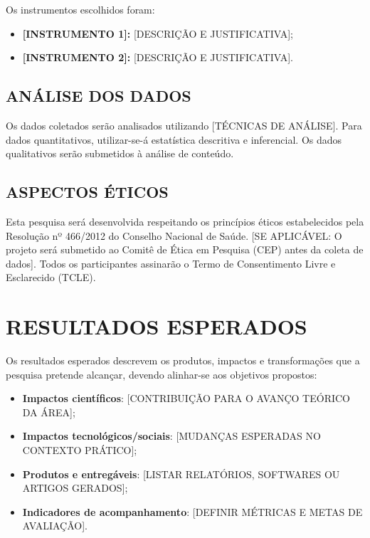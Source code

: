 \documentclass[
    12pt,        %
    openany,     %
    oneside,     %
    a4paper,     %
    english,     %
    french,      %
    spanish,     %
    brazil,      %
    article      %
]{abntex2}
\begin{document}
Os instrumentos escolhidos foram:
\begin{itemize}
    \item \textbf{[INSTRUMENTO 1]:} [DESCRIÇÃO E JUSTIFICATIVA];
    \item \textbf{[INSTRUMENTO 2]:} [DESCRIÇÃO E JUSTIFICATIVA].
\end{itemize}

\subsection{ANÁLISE DOS DADOS}
\label{subsec:analise-dados}

Os dados coletados serão analisados utilizando [TÉCNICAS DE ANÁLISE]. Para dados quantitativos, utilizar-se-á estatística descritiva e inferencial. Os dados qualitativos serão submetidos à análise de conteúdo.

\subsection{ASPECTOS ÉTICOS}
\label{subsec:aspectos-eticos}

Esta pesquisa será desenvolvida respeitando os princípios éticos estabelecidos pela Resolução nº 466/2012 do Conselho Nacional de Saúde. [SE APLICÁVEL: O projeto será submetido ao Comitê de Ética em Pesquisa (CEP) antes da coleta de dados]. Todos os participantes assinarão o Termo de Consentimento Livre e Esclarecido (TCLE).


\section{RESULTADOS ESPERADOS}
\label{sec:resultados-esperados}

Os resultados esperados descrevem os produtos, impactos e transformações que a pesquisa pretende alcançar, devendo alinhar-se aos objetivos propostos:

\begin{itemize}
    \item \textbf{Impactos científicos}: [CONTRIBUIÇÃO PARA O AVANÇO TEÓRICO DA ÁREA];
    \item \textbf{Impactos tecnológicos/sociais}: [MUDANÇAS ESPERADAS NO CONTEXTO PRÁTICO];
    \item \textbf{Produtos e entregáveis}: [LISTAR RELATÓRIOS, SOFTWARES OU ARTIGOS GERADOS];
    \item \textbf{Indicadores de acompanhamento}: [DEFINIR MÉTRICAS E METAS DE AVALIAÇÃO].
\end{itemize}
\end{document}
